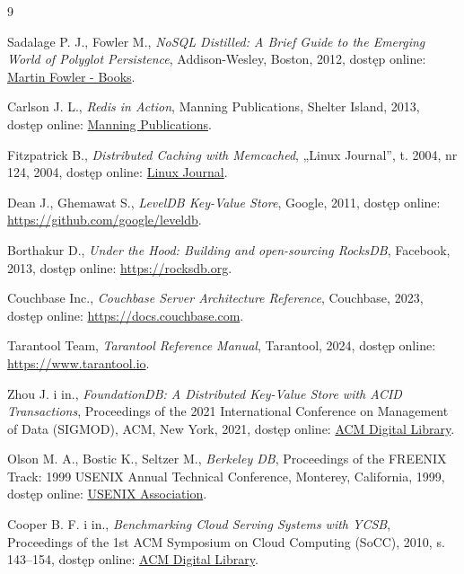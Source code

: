 \begin{thebibliography}{9}

Sadalage P. J., Fowler M., \emph{NoSQL Distilled: A Brief Guide to the Emerging World of Polyglot Persistence}, Addison-Wesley, Boston, 2012, dostęp online: \href{https://martinfowler.com/books/nosql.html}{Martin Fowler - Books}.

Carlson J. L., \emph{Redis in Action}, Manning Publications, Shelter Island, 2013, dostęp online: \href{https://www.manning.com/books/redis-in-action}{Manning Publications}.

Fitzpatrick B., \emph{Distributed Caching with Memcached}, „Linux Journal”, t. 2004, nr 124, 2004, dostęp online: \href{https://www.linuxjournal.com/article/7451}{Linux Journal}.

Dean J., Ghemawat S., \emph{LevelDB Key-Value Store}, Google, 2011, dostęp online: \url{https://github.com/google/leveldb}.

Borthakur D., \emph{Under the Hood: Building and open-sourcing RocksDB}, Facebook, 2013, dostęp online: \url{https://rocksdb.org}.

Couchbase Inc., \emph{Couchbase Server Architecture Reference}, Couchbase, 2023, dostęp online: \url{https://docs.couchbase.com}.

Tarantool Team, \emph{Tarantool Reference Manual}, Tarantool, 2024, dostęp online: \url{https://www.tarantool.io}.

Zhou J. i in., \emph{FoundationDB: A Distributed Key-Value Store with ACID Transactions}, Proceedings of the 2021 International Conference on Management of Data (SIGMOD), ACM, New York, 2021, dostęp online: \href{https://dl.acm.org/doi/10.1145/3448016.3457569}{ACM Digital Library}.

Olson M. A., Bostic K., Seltzer M., \emph{Berkeley DB}, Proceedings of the FREENIX Track: 1999 USENIX Annual Technical Conference, Monterey, California, 1999, dostęp online: \href{https://www.usenix.org/conference/1999-usenix-annual-technical-conference/berkeley-db}{USENIX Association}.

Cooper B. F. i in., \emph{Benchmarking Cloud Serving Systems with YCSB}, Proceedings of the 1st ACM Symposium on Cloud Computing (SoCC), 2010, s. 143--154, dostęp online: \href{https://dl.acm.org/doi/10.1145/1807128.1807152}{ACM Digital Library}.


\end{thebibliography}
